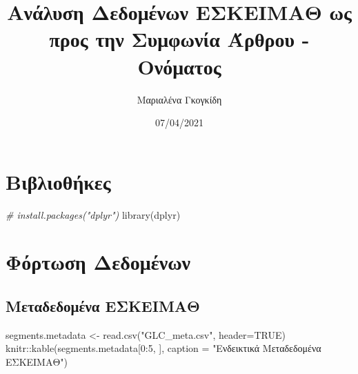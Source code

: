\documentclass[
]{article}
\title{Ανάλυση Δεδομένων ΕΣΚΕΙΜΑΘ ως προς την Συμφωνία Άρθρου -
Ονόματος}
\author{Μαριαλένα Γκογκίδη}
\date{07/04/2021}
\newenvironment{Shaded}{\begin{snugshade}}{\end{snugshade}}
\newcommand{\AttributeTok}[1]{\textcolor[rgb]{0.77,0.63,0.00}{#1}}
\newcommand{\CommentTok}[1]{\textcolor[rgb]{0.56,0.35,0.01}{\textit{#1}}}
\newcommand{\ConstantTok}[1]{\textcolor[rgb]{0.00,0.00,0.00}{#1}}
\newcommand{\DecValTok}[1]{\textcolor[rgb]{0.00,0.00,0.81}{#1}}
\newcommand{\FunctionTok}[1]{\textcolor[rgb]{0.00,0.00,0.00}{#1}}
\newcommand{\NormalTok}[1]{#1}
\newcommand{\OtherTok}[1]{\textcolor[rgb]{0.56,0.35,0.01}{#1}}
\newcommand{\SpecialCharTok}[1]{\textcolor[rgb]{0.00,0.00,0.00}{#1}}
\newcommand{\StringTok}[1]{\textcolor[rgb]{0.31,0.60,0.02}{#1}}
\begin{document}
\maketitle

\hypertarget{ux3b2ux3b9ux3b2ux3bbux3b9ux3bfux3b8ux3aeux3baux3b5ux3c2}{%
\section{Βιβλιοθήκες}\label{ux3b2ux3b9ux3b2ux3bbux3b9ux3bfux3b8ux3aeux3baux3b5ux3c2}}

\begin{Shaded}
\begin{Highlighting}[]
\CommentTok{\# install.packages("dplyr")}
\FunctionTok{library}\NormalTok{(dplyr)}
\end{Highlighting}
\end{Shaded}

\hypertarget{ux3c6ux3ccux3c1ux3c4ux3c9ux3c3ux3b7-ux3b4ux3b5ux3b4ux3bfux3bcux3adux3bdux3c9ux3bd}{%
\section{Φόρτωση
Δεδομένων}\label{ux3c6ux3ccux3c1ux3c4ux3c9ux3c3ux3b7-ux3b4ux3b5ux3b4ux3bfux3bcux3adux3bdux3c9ux3bd}}

\hypertarget{ux3bcux3b5ux3c4ux3b1ux3b4ux3b5ux3b4ux3bfux3bcux3adux3bdux3b1-ux3b5ux3c3ux3baux3b5ux3b9ux3bcux3b1ux3b8}{%
\subsection{Μεταδεδομένα
ΕΣΚΕΙΜΑΘ}\label{ux3bcux3b5ux3c4ux3b1ux3b4ux3b5ux3b4ux3bfux3bcux3adux3bdux3b1-ux3b5ux3c3ux3baux3b5ux3b9ux3bcux3b1ux3b8}}

\begin{Shaded}
\begin{Highlighting}[]
\NormalTok{segments.metadata }\OtherTok{\textless{}{-}} \FunctionTok{read.csv}\NormalTok{(}\StringTok{"GLC\_meta.csv"}\NormalTok{, }\AttributeTok{header=}\ConstantTok{TRUE}\NormalTok{)}
\NormalTok{knitr}\SpecialCharTok{::}\FunctionTok{kable}\NormalTok{(segments.metadata[}\DecValTok{0}\SpecialCharTok{:}\DecValTok{5}\NormalTok{, ], }\AttributeTok{caption =} \StringTok{"Ενδεικτικά Μεταδεδομένα ΕΣΚΕΙΜΑΘ"}\NormalTok{)}
\end{Highlighting}
\end{Shaded}
\end{document}
